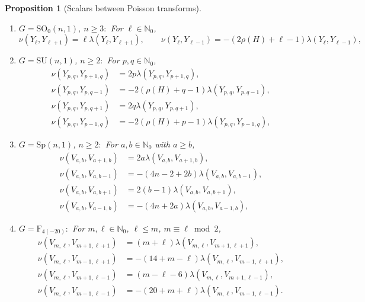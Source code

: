 \documentclass[JEP,XML,SOM,NoFloatCountersInSection,Unicode,published]{cedram}
\newtheorem{proposition}[theorem]{Proposition}
\theoremstyle{definition}
\newcommand{\rhoa}{\ensuremath{\rho}}
\newcommand{\N}{\ensuremath{\mathbb{N}}}
\newcommand{\GSO}[1]{\ensuremath{\mathrm{SO}_0(#1,1)}}
\newcommand{\GSU}[1]{\ensuremath{\mathrm{SU}(#1,1)}}
\newcommand{\GSp}[1]{\ensuremath{\mathrm{Sp}(#1,1)}}
\newcommand{\GF}{\ensuremath{\mathrm{F}_{4(-20)}}}
\begin{document}
\skpt
\begin{proposition}[Scalars between Poisson transforms]\label{prop:nu_explicit}
\begin{enumerate}
\item $G=\GSO{n}$, $n\geq 3\colon$ For $\ell\in\N_0$,
\[
\nu(Y_\ell,Y_{\ell+1})=\ell\lambda(Y_\ell,Y_{\ell+1}),\qquad\nu(Y_{\ell},Y_{\ell-1})=-(2\rhoa(H)+\ell-1)\lambda(Y_{\ell},Y_{\ell-1}),
\]
\item $G=\GSU{n}$, $n\geq 2\colon$ For $p,q\in\N_0$,
\begin{align*}
\nu(Y_{p,q},Y_{p+1,q})&=2p\lambda(Y_{p,q},Y_{p+1,q}),\\
\nu(Y_{p,q},Y_{p,q-1})&=-2(\rhoa(H)+q-1)\lambda(Y_{p,q},Y_{p,q-1}),\\
\nu(Y_{p,q},Y_{p,q+1})&=2q\lambda(Y_{p,q},Y_{p,q+1}),\\
\nu(Y_{p,q},Y_{p-1,q})&=-2(\rhoa(H)+p-1)\lambda(Y_{p,q},Y_{p-1,q}),
\end{align*}
\item $G=\GSp{n}$, $n\geq 2\colon$ For $a,b\in\N_0$ with $a\geq b$,
\begin{align*}
\nu(V_{a,b},V_{a+1,b})&=2a\lambda(V_{a,b},V_{a+1,b}),\\
\nu(V_{a,b},V_{a,b-1})&=-(4n-2+2b)\lambda(V_{a,b},V_{a,b-1}),\\
\nu(V_{a,b},V_{a,b+1})&=2(b-1)\lambda(V_{a,b},V_{a,b+1}),\\
\nu(V_{a,b},V_{a-1,b})&=-(4n+2a)\lambda(V_{a,b},V_{a-1,b}),
\end{align*}
\item $G=\GF\colon$ For $m,\ell\in\N_0$, $\ell\leq m$, $m\equiv\ell\bmod2$,
\begin{align*}
\nu(V_{m,\ell},V_{m+1,\ell+1})&=(m+\ell)\lambda(V_{m,\ell},V_{m+1,\ell+1}),\\
\nu(V_{m,\ell},V_{m-1,\ell+1})&=-(14+m-\ell)\lambda(V_{m,\ell},V_{m-1,\ell+1}),\\
\nu(V_{m,\ell},V_{m+1,\ell-1})&=(m-\ell-6)\lambda(V_{m,\ell},V_{m+1,\ell-1}),\\
\nu(V_{m,\ell},V_{m-1,\ell-1})&=-(20+m+\ell)\lambda(V_{m,\ell},V_{m-1,\ell-1}).
\end{align*}
\end{enumerate}
\end{proposition}
\end{document}

